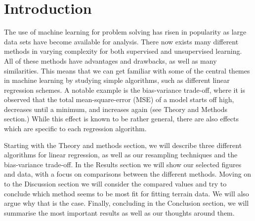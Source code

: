 \section{Introduction}
\label{sec:introduction}

The use of machine learning for problem solving has risen in popularity as large data sets have become available for analysis. There now exists many different methods in varying complexity for both supervised and unsupervised learning. All of these methods have advantages and drawbacks, as well as many similarities. This means that we can get familiar with some of the central themes in machine learning by studying simple algorithms, such as different linear regression schemes. A notable example is the bias-variance trade-off, where it is observed that the total mean-square-error (MSE) of a model starts off high, decreases until a minimum, and increases again (see Theory and Methods section.) While this effect is known to be rather general, there are also effects which are specific to each regression algorithm.

Starting with the Theory and methods section, we will describe three different algorithms for linear regression, as well as our resampling techniques and the bias-variance trade-off. In the Results section we will show our selected figures and data, with a focus on comparisons between the different methods. Moving on to the Discussion section we will consider the compared values and try to conclude which method seems to be most fit for fitting terrain data. We will also argue why that is the case. Finally, concluding in the Conclusion section, we will summarise the most important results as well as our thoughts around them.